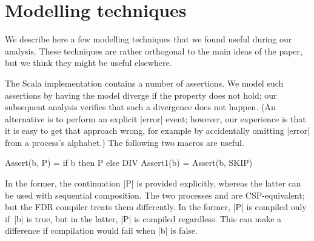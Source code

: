 \section{Modelling techniques}
\label{app:modelling}

\inlineCSP

We describe here a few modelling techniques that we found useful during our
analysis.  These techniques are rather orthogonal to the main ideas of the
paper, but we think they might be useful elsewhere. 



The Scala implementation contains a number of assertions.  We model such
assertions by having the model diverge if the property does not hold; our
subsequent analysis verifies that such a divergence does not happen.  (An
alternative is to perform an explicit |error| event; however, our experience
is that it is easy to get that approach wrong, for example by accidentally
omitting |error| from a process's alphabet.)  The following two macros are
useful.
%
\begin{cspm}
Assert(b, P) = if b then P else DIV
Assert1(b) = Assert(b, SKIP)
\end{cspm}
%
In the former, the continuation |P| is provided explicitly, whereas the latter
can be used with sequential composition.  The two processes  and  are CSP-equivalent; but the FDR compiler treats
them differently.  In the former, |P| is compiled only if~|b| is true, but in
the latter, |P| is compiled regardless.  This can make a difference if
compilation would fail when |b| is false.  

